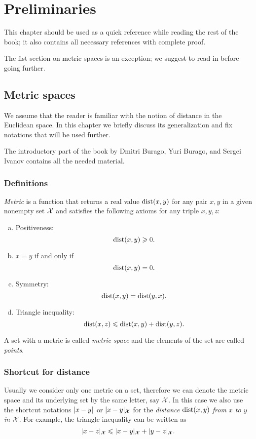 \addtocounter{chapter}{-1}
\chapter{Preliminaries}

This chapter should be used as a quick reference while reading the rest of the book;
it also contains all necessary references with complete proof.

The fist section on metric spaces is an exception;
we suggest to read in before going further.

\section{Metric spaces}\label{sec:metric-spcaes}

We assume that the reader is familiar with the notion of distance in the 
Euclidean space.
In this chapter we briefly discuss its generalization and fix notations that will be used further.

The introductory part of the book by Dmitri Burago, Yuri Burago, and Sergei Ivanov \cite{burago-burago-ivanov} contains all the needed material.

\subsection*{Definitions}

\emph{Metric} is a function that returns a real value $\mathop{\rm dist}\nolimits(x,y)$ for any pair $x,y$ in a given nonempty set $\mathcal{X}$  and satisfies the following axioms for any triple $x,y,z$: \label{page:def:metric}
\begin{enumerate}[(a)]
\item\label{def:metric-space:a} Positiveness: 
$$\mathop{\rm dist}\nolimits(x,y)\geqslant 0.$$
\item\label{def:metric-space:b} $x=y$ if and only if 
$$\mathop{\rm dist}\nolimits(x,y)=0.$$
\item\label{def:metric-space:c} Symmetry: $$\mathop{\rm dist}\nolimits(x, y) = \mathop{\rm dist}\nolimits(y, x).$$
\item\label{def:metric-space:d} Triangle inequality: 
$$\mathop{\rm dist}\nolimits(x, z) \leqslant \mathop{\rm dist}\nolimits(x, y) + \mathop{\rm dist}\nolimits(y, z).$$
\end{enumerate}

A set with a metric is called \emph{metric space} and the elements of the set are called \emph{points}.

\subsection*{Shortcut for distance}
Usually we consider only one metric on a set, therefore we can denote the metric space and its underlying set by the same letter, say $\mathcal{X}$.
In this case we also use the shortcut notations $\dist{x}{y}{}$ or $\dist{x}{y}{\spc{X}}$  for the {}\emph{distance $\mathop{\rm dist}\nolimits(x,y)$ from $x$ to $y$ in $\mathcal{X}$}.
For example, the triangle inequality can be written as 
$$\dist{x}{z}{\spc{X}}\le \dist{x}{y}{\spc{X}}+\dist{y}{z}{\spc{X}}.$$

